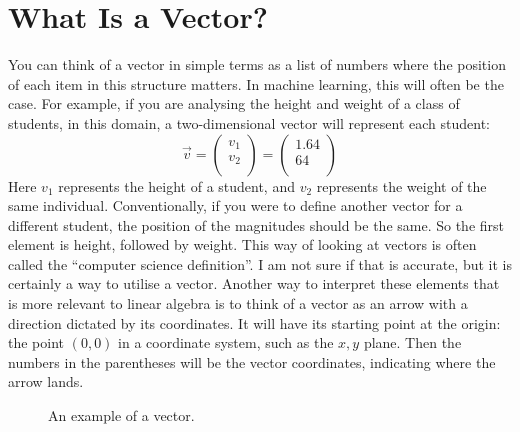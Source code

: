 \documentclass[600paper, 11pt,twoside,openany]{kdp}
\begin{document}
\chapter{What Is a Vector?}
\indent You can think of a vector in simple terms as a list of numbers where the position of each item in this structure matters. In machine learning, this will often be the case. For example, if you are analysing the height and weight of a class of students, in this domain, a two-dimensional vector will represent each student:
\[\overrightarrow{v} = \begin{pmatrix}
 v_1\\
 v_2\\
\end{pmatrix} =  \begin{pmatrix}
 1.64\\
 64\\
\end{pmatrix}\]
\indent Here  $v_1$ represents the height of a student, and $v_2$ represents the weight of the same individual. Conventionally, if you were to define another vector for a different student, the position of the magnitudes should be the same. So the first element is height, followed by weight. This way of looking at vectors is often called the “computer science definition”. I am not sure if that is accurate, but it is certainly a way to utilise a vector. Another way to interpret these elements that is more relevant to linear algebra is to think of a vector as an arrow with a direction dictated by its coordinates. It will have its starting point at the origin: the point $(0,0)$ in a coordinate system, such as the $x,y$ plane. Then the numbers in the parentheses will be the vector coordinates, indicating where the arrow lands.

\begin{figure}[]
\begin{center}
\end{center}
\caption{An example of a vector.}\label{fig:vectorExample}
\end{figure}
\end{document}
